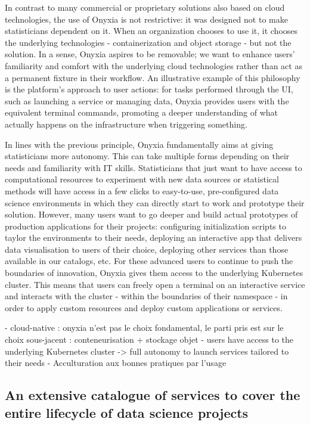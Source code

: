 In contrast to many commercial or proprietary solutions also based on cloud technologies, the use of Onyxia is not restrictive: it was designed not to make statisticians dependent on it. When an organization chooses to use it, it chooses the underlying technologies - containerization and object storage - but not the solution. In a sense, Onyxia aspires to be removable; we want to enhance users' familiarity and comfort with the underlying cloud technologies rather than act as a permanent fixture in their workflow. An illustrative example of this philosophy is the platform's approach to user actions: for tasks performed through the UI, such as launching a service or managing data, Onyxia provides users with the equivalent terminal commands, promoting a deeper understanding of what actually happens on the infrastructure when triggering something. 

In lines with the previous principle, Onyxia fundamentally aims at giving statisticians more autonomy. This can take multiple forms depending on their needs and familiarity with IT skills. Statisticians that just want to have access to computational resources to experiment with new data sources or statistical methods will have access in a few clicks to easy-to-use, pre-configured data science environments in which they can directly start to work and prototype their solution. However, many users want to go deeper and build actual prototypes of production applications for their projects: configuring initialization scripts to taylor the environments to their needs, deploying an interactive app that delivers data visualisation to users of their choice, deploying other services than those available in our catalogs, etc. For these advanced users to continue to push the boundaries of innovation, Onyxia gives them access to the underlying Kubernetes cluster. This means that users can freely open a terminal on an interactive service and interacts with the cluster - within the boundaries of their namespace - in order to apply custom resources and deploy custom applications or services.

- cloud-native : onyxia n'est pas le choix fondamental, le parti pris est sur le choix sous-jacent : conteneurisation + stockage objet
- users have access to the underlying Kubernetes cluster -> full autonomy to launch services tailored to their needs
- Acculturation aux bonnes pratiques par l'usage

\label{ssec:catalog}
\subsection{An extensive catalogue of services to cover the entire lifecycle of data science projects}

